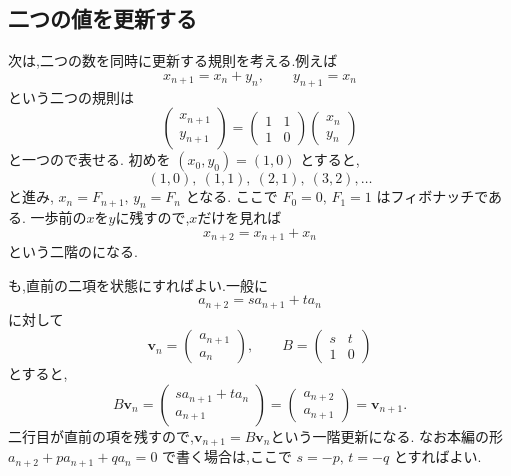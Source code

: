 \subsection{二つの値を更新する}\label{節：状態を二つ持つと,二階の漸化式になる}

次は,二つの数を同時に更新する規則を考える.例えば
\[
  x_{n+1}=x_n+y_n,
  \qquad
  y_{n+1}=x_n
\]
という二つの規則は
\[
  \begin{pmatrix}x_{n+1}\\y_{n+1}\end{pmatrix}
  =
  \begin{pmatrix}1&1\\1&0\end{pmatrix}
  \begin{pmatrix}x_n\\y_n\end{pmatrix}
\]
と一つので表せる.
初めを $(x_0,y_0)=(1,0)$ とすると,
\[
  (1,0),\ (1,1),\ (2,1),\ (3,2),\ldots
\]
と進み,\,$\,x_n=F_{n+1},\,y_n=F_n$ となる.
ここで $F_0=0,\,F_1=1$ はフィボナッチである.
一歩前の$x$を$y$に残すので,$x$だけを見れば
\[
  x_{n+2}=x_{n+1}+x_n
\]
という二階のになる.

も,直前の二項を状態にすればよい.一般に
\[
  a_{n+2}=s a_{n+1}+t a_n
\]
に対して
\[
  \boldsymbol{v}_n=
  \begin{pmatrix}a_{n+1}\\a_n\end{pmatrix},
  \qquad
  B=\begin{pmatrix}s&t\\1&0\end{pmatrix}
\]
とすると,
\[
  B\boldsymbol{v}_n
  =
  \begin{pmatrix}s a_{n+1}+t a_n\\a_{n+1}\end{pmatrix}
  =
  \begin{pmatrix}a_{n+2}\\a_{n+1}\end{pmatrix}
  =\boldsymbol{v}_{n+1}.
\]
二行目が直前の項を残すので,$\boldsymbol{v}_{n+1}=B\boldsymbol{v}_n$という一階更新になる.
なお本編の形 $a_{n+2}+pa_{n+1}+qa_n=0$ で書く場合は,ここで $s=-p,\,t=-q$ とすればよい.


